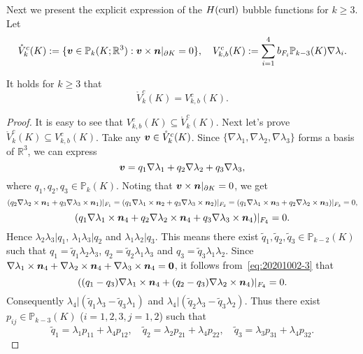 Next we present the explicit expression of the $H(\operatorname{curl})$ bubble functions for $k\geq3$. Let
\[
\mathring V_{k}^c(K):=\{\boldsymbol v\in\mathbb P_{k}(K;\mathbb R^3): \boldsymbol v\times\boldsymbol n|_{\partial K}=0\},\quad
V_{k,b}^c(K):=\sum_{i=1}^4b_{F_i}\mathbb P_{k-3}(K)\nabla\lambda_{i}.
\]
\begin{lemma}
It holds for $k\geq3$ that
\begin{equation}\label{eq:Hcurlbubbleidentity}
\mathring V_{k}^c(K)=V_{k,b}^c(K).
\end{equation}
\end{lemma}
\begin{proof}
It is easy to see that $V_{k,b}^c(K)\subseteq\mathring V_{k}^c(K)$. Next let's prove $\mathring V_{k}^c(K)\subseteq V_{k,b}^c(K)$. Take any $\boldsymbol v\in\mathring V_{k}^c(K)$. Since $\{\nabla\lambda_{1}, \nabla\lambda_{2}, \nabla\lambda_{3}\}$ forms a basis of $\mathbb R^3$, we can express 
$$\boldsymbol v=q_1\nabla\lambda_{1}+q_2\nabla\lambda_{2}+q_3\nabla\lambda_{3},$$ 
where $q_1, q_2, q_3\in\mathbb P_k(K)$. Noting that $\boldsymbol v\times\boldsymbol n|_{\partial K}=0$, we get
\[
(q_2\nabla\lambda_{2}\times\boldsymbol n_1+q_3\nabla\lambda_{3}\times\boldsymbol n_1)|_{F_1}= 
(q_1\nabla\lambda_{1}\times\boldsymbol n_2+q_3\nabla\lambda_{3}\times\boldsymbol n_2)|_{F_2}= 
(q_1\nabla\lambda_{1}\times\boldsymbol n_3+q_2\nabla\lambda_{2}\times\boldsymbol n_3)|_{F_3}=0,
\]
\begin{equation}\label{eq:20201002-3}
(q_1\nabla\lambda_{1}\times\boldsymbol n_4+q_2\nabla\lambda_{2}\times\boldsymbol n_4+q_3\nabla\lambda_{3}\times\boldsymbol n_4)|_{F_4}=0.
\end{equation}
Hence $\lambda_2\lambda_3|q_1$, $\lambda_1\lambda_3|q_2$ and $\lambda_1\lambda_2|q_3$. This means
there exist $\tilde q_1, \tilde q_2, \tilde q_3\in\mathbb P_{k-2}(K)$ such that $q_1=\tilde q_1\lambda_2\lambda_3$, $q_2=\tilde q_2\lambda_1\lambda_3$ and $q_3=\tilde q_3\lambda_1\lambda_2$.  %
Since $\nabla\lambda_{1}\times\boldsymbol n_4+\nabla\lambda_{2}\times\boldsymbol n_4+\nabla\lambda_{3}\times\boldsymbol n_4=\boldsymbol0$,
it follows from~\eqref{eq:20201002-3} that
\[
((q_1-q_3)\nabla\lambda_{1}\times\boldsymbol n_4+(q_2-q_3)\nabla\lambda_{2}\times\boldsymbol n_4)|_{F_4}=0.
\]
Consequently $\lambda_4|(\tilde q_1\lambda_3-\tilde q_3\lambda_1)$ and $\lambda_4|(\tilde q_2\lambda_3-\tilde q_3\lambda_2)$. 
Thus there exist $p_{ij}\in\mathbb P_{k-3}(K)$ ($i=1,2,3, j=1,2$) such that
\[
\tilde q_1=\lambda_1p_{11}+\lambda_4p_{12},
\quad \tilde q_2=\lambda_2p_{21}+\lambda_4p_{22}, \quad \tilde q_3=\lambda_3p_{31}+\lambda_4p_{32}.
\]
\end{proof}
